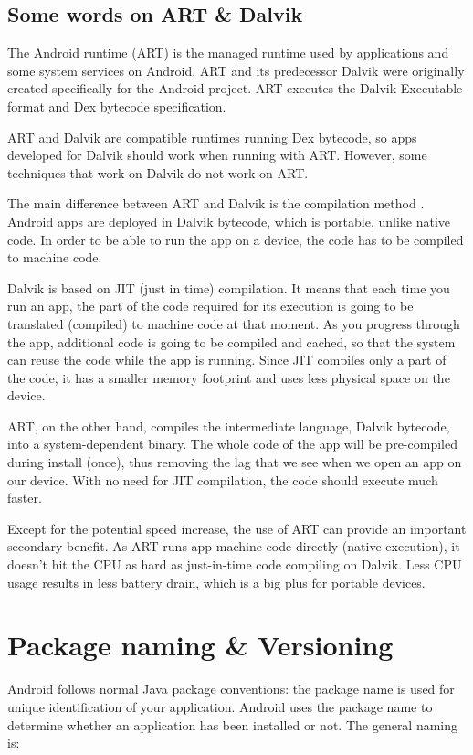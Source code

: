 \subsection{Some words on ART \& Dalvik}
The Android runtime (ART) \cite{Android2019} is the managed runtime used by applications and some system services on Android.
ART and its predecessor Dalvik were originally created specifically for the Android project.
ART executes the Dalvik Executable format and Dex bytecode specification.

ART and Dalvik are compatible runtimes running Dex bytecode, so apps developed for Dalvik should work when running with ART.
However, some techniques that work on Dalvik do not work on ART.

The main difference between ART and Dalvik is the compilation method \cite{Vitas2013}.
Android apps are deployed in Dalvik bytecode, which is portable, unlike native code.
In order to be able to run the app on a device, the code has to be compiled to machine code.

Dalvik is based on JIT (just in time) compilation.
It means that each time you run an app, the part of the code required for its execution is going to be translated (compiled) to machine code at that moment.
As you progress through the app, additional code is going to be compiled and cached, so that the system can reuse the code while the app is running.
Since JIT compiles only a part of the code, it has a smaller memory footprint and uses less physical space on the device.

ART, on the other hand, compiles the intermediate language, Dalvik bytecode, into a system-dependent binary.
The whole code of the app will be pre-compiled during install (once), thus removing the lag that we see when we open an app on our device.
With no need for JIT compilation, the code should execute much faster.

Except for the potential speed increase, the use of ART can provide an important secondary benefit.
As ART runs app machine code directly (native execution), it doesn't hit the CPU as hard as just-in-time code compiling on Dalvik.
Less CPU usage results in less battery drain, which is a big plus for portable devices.


\section{Package naming \& Versioning}
Android follows normal Java package conventions: the package name is used for unique identification of your application.
Android uses the package name to determine whether an application has been installed or not.
The general naming is:

